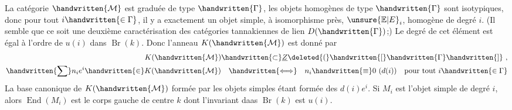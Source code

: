  La catégorie $\handwritten{\mathcal{M}}$ est graduée de type $\handwritten{\Gamma}$, les objets homogènes de type $\handwritten{\Gamma}$ sont isotypiques, donc pour tout $i\handwritten{\in\Gamma}$, il y a exactement un objet simple, à isomorphisme près, $\unsure{\mathbb{E}|E}_i$,  homogène de degré $i$. (Il semble que ce soit une deuxième caractérisation des catégories tannakiennes de lien $D(\handwritten{\Gamma})$;) Le degré de cet élément est égal à l'ordre de $u(i)$ dans $\operatorname{Br}(k)$. Donc l'anneau $K(\handwritten{\mathcal{M}})$ est donné par
\[
\begin{aligned}
K(\handwritten{\mathcal{M}})\handwritten{\subset}\underline{Z}\deleted{(}\handwritten{[}\handwritten{\Gamma}\handwritten{]}\ ,\\
\handwritten{\sum}n_i e^i\handwritten{\in}K(\handwritten{\mathcal{M}})\quad\handwritten{\Longleftrightarrow}\quad n_i\handwritten{\equiv}0\ (d(i))\quad\text{pour tout }i\handwritten{\in\Gamma}
\end{aligned}
\]
La base canonique de $K(\handwritten{\mathcal{M}})$ formée par les objets simples étant formée des $d(i)e^i$. Si $M_i$ est l'objet simple de  degré $i$, alors $\operatorname{End}(M_i)$ est le corps gauche  de centre $k$ dont l'invariant daas $\operatorname{Br}(k)$ est $u(i)$.


